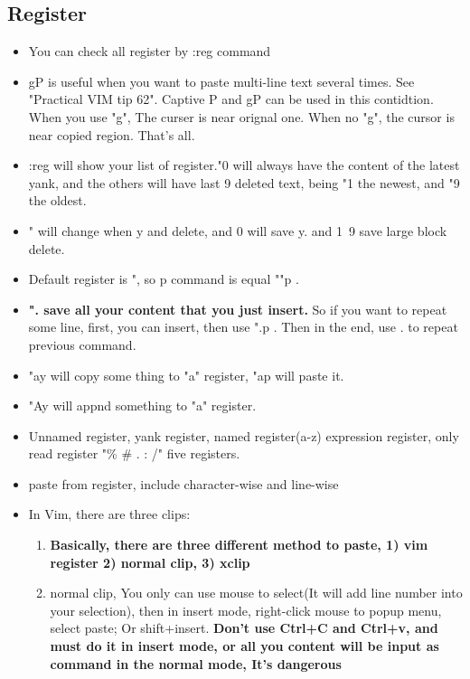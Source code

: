 \documentclass[a4paper,12pt,twoside]{book}
\begin{document}
\subsection{Register}
	\begin{itemize}
			\item You can check all register by :reg command 
			
			\item gP is useful when you want to paste multi-line text several times. See "Practical VIM tip 62". Captive P and gP can be used in this contidtion. When you use "g", The curser is near orignal one. When no "g", the cursor is near copied region. That's all.

			\item :reg will show your list of register."0 will always have the content of the latest yank, and the others will have last 9 deleted text, being "1 the newest, and "9 the oldest.

			\item " will change when y and delete, and 0 will save y. and 1~9 save large block delete. 

			\item Default register is ", so p command is equal ""p .

			\item \textbf{". save all your content that you just insert.} So if you want to repeat some line, first, you can insert, then use ".p . Then in the end, use . to repeat previous command. 

			\item "ay will copy some thing to "a" register, "ap will paste it.
					
			\item "Ay will appnd something to "a" register.

			\item Unnamed register, yank register,  named register(a-z) expression register, only read register "\% \# . : /" five registers. 

			\item paste from register,  include character-wise and line-wise 
					
		\item In Vim, there are three clips: 
				\begin{enumerate}
		\item \textbf{Basically, there are three different method to paste, 1) vim register 2) normal clip, 3) xclip} 

		\item normal clip, You only can use mouse to select(It will add line number into your selection), then in insert mode, right-click mouse to popup menu, select paste; Or shift+insert. \textbf{Don't use Ctrl+C and Ctrl+v, and must do it in insert mode, or all you content will be input as command in the normal mode, It's dangerous}
		

\end{enumerate}
\end{itemize}
\end{document}
